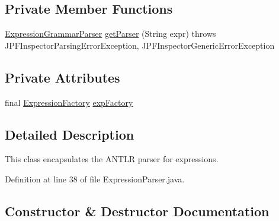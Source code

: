 \subsection*{Private Member Functions}
\begin{DoxyCompactItemize}
\item 
\hyperlink{classgov_1_1nasa_1_1jpf_1_1inspector_1_1server_1_1expression_1_1parser_1_1_expression_grammar_parser}{Expression\+Grammar\+Parser} \hyperlink{classgov_1_1nasa_1_1jpf_1_1inspector_1_1server_1_1expression_1_1_expression_parser_aaef85bb6690c79fcbadd105acdf46e18}{get\+Parser} (String expr)  throws J\+P\+F\+Inspector\+Parsing\+Error\+Exception, J\+P\+F\+Inspector\+Generic\+Error\+Exception 
\end{DoxyCompactItemize}
\subsection*{Private Attributes}
\begin{DoxyCompactItemize}
\item 
final \hyperlink{classgov_1_1nasa_1_1jpf_1_1inspector_1_1server_1_1expression_1_1_expression_factory}{Expression\+Factory} \hyperlink{classgov_1_1nasa_1_1jpf_1_1inspector_1_1server_1_1expression_1_1_expression_parser_ac104f9da945e44fd45fb00c2dfb83706}{exp\+Factory}
\end{DoxyCompactItemize}


\subsection{Detailed Description}
This class encapsulates the A\+N\+T\+LR parser for expressions. 

Definition at line 38 of file Expression\+Parser.\+java.



\subsection{Constructor \& Destructor Documentation}
